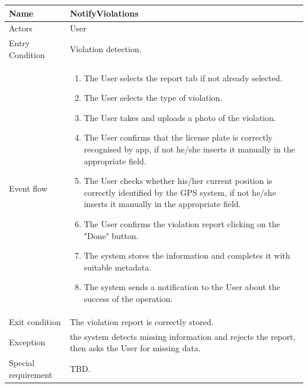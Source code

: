 \begin{tabular}{|p{3.7cm}|p{11cm}|}
\hline
Name & NotifyViolations\\
\hline
Actors & User\\
\hline
Entry Condition & Violation detection.\\
\hline
Event flow & \begin{enumerate}
                \item The User selects the report tab if not already selected.
                \item The User selects the type of violation.
                \item The User takes and uploads a photo of the violation.
                \item The User confirms that the license plate is correctly recognised by app, if not he/she inserts it manually in the appropriate field.
                \item The User checks whether his/her current position is correctly identified by the GPS system, if not he/she inserts it manually in the appropriate field.
                \item The User confirms the violation report clicking on the "Done" button.
                \item The system stores the information and completes it with suitable metadata.
                \item The system sends a notification to the User about the success of the operation.
            \end{enumerate}\\
\hline
Exit condition & The violation report is correctly stored.\\
\hline
Exception & the system detects missing information and rejects the report, then asks the User for missing data.\\
\hline
Special requirement & TBD.\\
\hline
\end{tabular}

